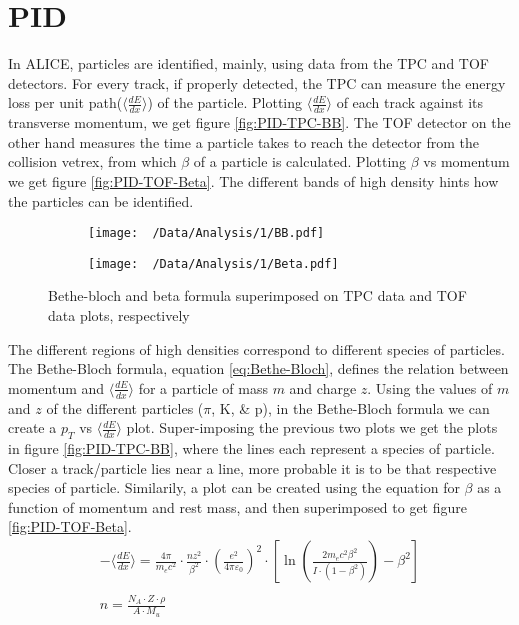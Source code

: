 \documentclass[12pt,a4paper,twoside]{report}
\begin{document}
\section{PID}
In ALICE, particles are identified, mainly, using data from the TPC and TOF detectors. For every track, if properly detected, the TPC can measure the energy loss per unit path($\langle{ \frac{dE}{dx}}\rangle$) of the particle. Plotting $\langle{ \frac{dE}{dx}}\rangle$ of each track against its transverse momentum, we get figure \ref{fig:PID-TPC-BB}. The TOF detector on the other hand measures the time a particle takes to reach the detector from the collision vetrex, from which $\beta$ of a particle is calculated. Plotting $\beta$ vs momentum we get figure \ref{fig:PID-TOF-Beta}. The different bands of high density hints how the particles can be identified.\\
\begin{figure}[H]
	\begin{subfigure}{0.49\linewidth}
		\texttt{[image: ~/Data/Analysis/1/BB.pdf]}
	\end{subfigure}
	\begin{subfigure}{0.49\linewidth}
		\texttt{[image: ~/Data/Analysis/1/Beta.pdf]}
	\end{subfigure}
	\caption{\label{fig:PID-TPC-TOF}Bethe-bloch and beta formula superimposed on TPC data and TOF data plots, respectively}
\end{figure}
The different regions of high densities correspond to different species of particles. The Bethe-Bloch formula, equation \ref{eq:Bethe-Bloch}, defines the relation between momentum and $\langle{ \frac{dE}{dx}}\rangle$ for a particle of mass $m$ and charge $z$. Using the values of $m$ and $z$ of the different particles ($\pi$, K, \& p), in the Bethe-Bloch formula we can create a $p_T$ vs $\langle{ \frac{dE}{dx}}\rangle$ plot. Super-imposing the previous two plots we get the plots in figure \ref{fig:PID-TPC-BB}, where the lines each represent a species of particle. Closer a track/particle lies near a line, more probable it is to be that respective species of particle. Similarily, a plot can be created using the equation for $\beta$ as a function of momentum and rest mass, and then superimposed to get figure \ref{fig:PID-TOF-Beta}.
\begin{align}\label{eq:Bethe-Bloch}
	-\langle\frac{dE}{dx}\rangle=\frac{4\pi}{m_{e}c^2}\cdot\frac{nz^2}{\beta^2}\cdot(\frac{e^2}{4\pi\varepsilon_0})^2\cdot[\ln(\frac{2m_ec^2\beta^2}{I\cdot(1-\beta^2)})-\beta^2]
	\\\nonumber\\\nonumber
	n=\frac{N_A\cdot Z\cdot\rho}{A\cdot M_u}
\end{align}
\end{document}
